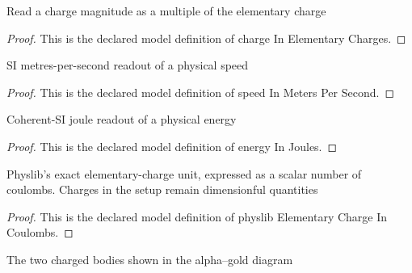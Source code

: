 \begin{definition}
  \label{def:physics:phyx-mini-0635:phyxminiproblems-problemphyxmini0635-chargeinelementarycharges}
  Read a charge magnitude as a multiple of the elementary charge
\end{definition}
\begin{proof}
  This is the declared model definition of charge In Elementary Charges.
\end{proof}
\begin{definition}
  \label{def:physics:phyx-mini-0635:phyxminiproblems-problemphyxmini0635-speedinmeterspersecond}
  SI metres-per-second readout of a physical speed
\end{definition}
\begin{proof}
  This is the declared model definition of speed In Meters Per Second.
\end{proof}
\begin{definition}
  \label{def:physics:phyx-mini-0635:phyxminiproblems-problemphyxmini0635-energyinjoules}
  Coherent-SI joule readout of a physical energy
\end{definition}
\begin{proof}
  This is the declared model definition of energy In Joules.
\end{proof}
\begin{definition}
  \label{def:physics:phyx-mini-0635:phyxminiproblems-problemphyxmini0635-physlibelementarychargeincoulombs}
  Physlib's exact elementary-charge unit, expressed as a scalar number of coulombs. Charges in the setup remain dimensionful quantities
\end{definition}
\begin{proof}
  This is the declared model definition of physlib Elementary Charge In Coulombs.
\end{proof}
\begin{definition}
  \label{def:physics:phyx-mini-0635:phyxminiproblems-problemphyxmini0635-figurebody}
  The two charged bodies shown in the alpha--gold diagram
\end{definition}
